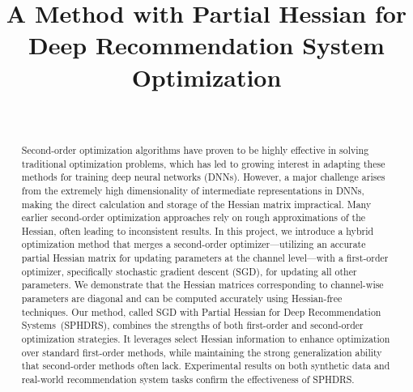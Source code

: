 \documentclass[conference]{IEEEtran}
\begin{document}
\title{A Method with Partial Hessian for Deep Recommendation System Optimization}


\author{ \\
\and
{}}

\maketitle

\begin{abstract}
Second-order optimization algorithms have proven to be highly effective in solving traditional optimization problems, which has led to growing interest in adapting these methods for training deep neural networks (DNNs). However, a major challenge arises from the extremely high dimensionality of intermediate representations in DNNs, making the direct calculation and storage of the Hessian matrix impractical. Many earlier second-order optimization approaches rely on rough approximations of the Hessian, often leading to inconsistent results. In this project, we introduce a hybrid optimization method that merges a second-order optimizer—utilizing an accurate partial Hessian matrix for updating parameters at the channel level—with a first-order optimizer, specifically stochastic gradient descent (SGD), for updating all other parameters. We demonstrate that the Hessian matrices corresponding to channel-wise parameters are diagonal and can be computed accurately using Hessian-free techniques. Our method, called SGD with Partial Hessian for Deep Recommendation Systems~(SPHDRS), combines the strengths of both first-order and second-order optimization strategies. It leverages select Hessian information to enhance optimization over standard first-order methods, while maintaining the strong generalization ability that second-order methods often lack. Experimental results on both synthetic data and real-world recommendation system tasks confirm the effectiveness of SPHDRS.
\end{abstract}
\end{document}
